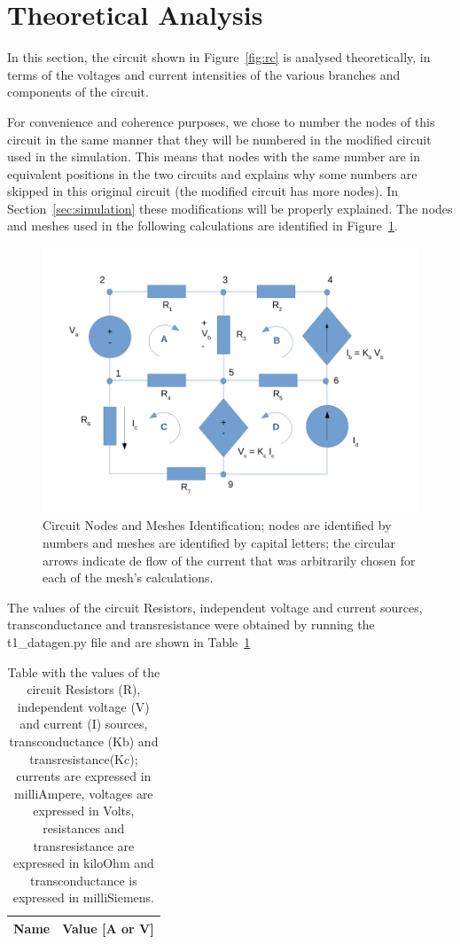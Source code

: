 \section{Theoretical Analysis}
\label{sec:analysis}

In this section, the circuit shown in Figure~\ref{fig:rc} is analysed
theoretically, in terms of the voltages and current intensities of the various branches and components of the circuit.

For convenience and coherence purposes, we chose to number the nodes of this circuit in the same manner that they will be numbered in the modified circuit used in the simulation. This means that nodes with the same number are in equivalent positions in the two circuits and explains why some numbers are skipped in this original circuit (the modified circuit has more nodes). In Section~\ref{sec:simulation} these modifications will be properly explained.
The nodes and meshes used in the following calculations are identified in Figure~\ref{fig:circuit_analysis}.

\begin{figure}[h] \centering
\includegraphics[width=0.8\linewidth]{circuit_analysis.pdf}
\caption{Circuit Nodes and Meshes Identification; nodes are identified by numbers and meshes are identified by capital letters; the circular arrows indicate de flow of the current that was arbitrarily chosen for each of the mesh's calculations.}
\label{fig:circuit_analysis}
\end{figure}

The values of the circuit Resistors, independent voltage and current sources, transconductance and transresistance were obtained by running the t1_datagen.py file and are shown in Table~\ref{tab:data}

\begin{table}[h]
  \centering
  \begin{tabular}{|l|r|}
    \hline    
    {\bf Name} & {\bf Value [A or V]} \\ \hline
    
  \end{tabular}
  \caption{Table with the values of the circuit Resistors (R), independent voltage (V) and current (I) sources, transconductance (Kb) and transresistance(Kc); currents are expressed in milliAmpere, voltages are expressed in Volts, resistances and transresistance are expressed in kiloOhm and transconductance is expressed in milliSiemens.}
  \label{tab:data}
\end{table}


